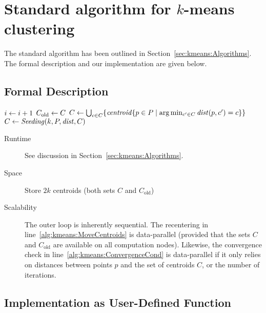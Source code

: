 \section[Standard algorithm for k-means clustering]{Standard algorithm for $k$-means clustering}

The standard algorithm has been outlined in Section~\ref{sec:kmeans:Algorithms}. The formal description and our implementation are given below.

\subsection{Formal Description}

\begin{algorithm} \label{alg:kmeans}
\begin{algorithmic}[1]
	\Repeat
		\State $i \leftarrow i + 1$
		\State $C_\text{old} \leftarrow C$
		\State $C \leftarrow \bigcup_{c \in C} \{ \mathit{centroid} \{p \in P \mid \arg\min_{c' \in C} \mathit{dist}(p, c') = c \} \}$ \label{alg:kmeans:MoveCentroids}
		\State $C \leftarrow \mathit{Seeding}(k, P, \mathit{dist}, C)$ \label{alg:kmeans:Reseed} 
	 \label{alg:kmeans:ConvergenceCond}
\end{algorithmic}
\end{algorithm}

\begin{description}
	\item[Runtime] See discussion in Section~\ref{sec:kmeans:Algorithms}.
	\item[Space] Store $2k$ centroids (both sets $C$ and $C_\text{old}$)
	\item[Scalability] The outer loop is inherently sequential. The recentering in line~\ref{alg:kmeans:MoveCentroids} is data-parallel (provided that the sets $C$ and $C_\text{old}$ are available on all computation nodes). Likewise, the convergence check in line~\ref{alg:kmeans:ConvergenceCond} is data-parallel if it only relies on distances between points $p$ and the set of centroids $C$, or the number of iterations.
\end{description}

\subsection{Implementation as User-Defined Function}

